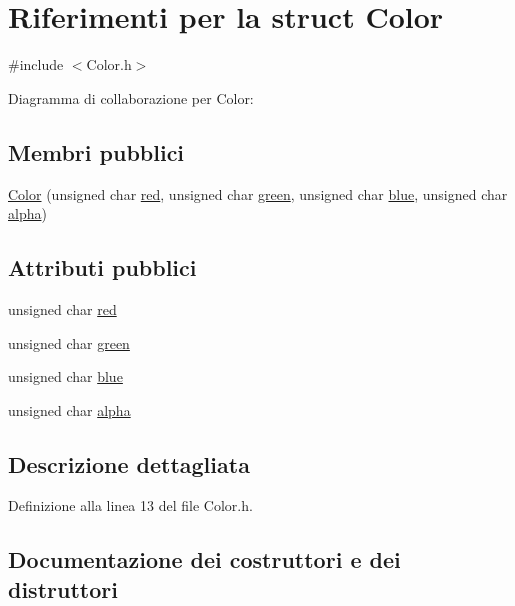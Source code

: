 \hypertarget{struct_color}{}\section{Riferimenti per la struct Color}
\label{struct_color}


{\ttfamily \#include $<$Color.\+h$>$}



Diagramma di collaborazione per Color\+:
\subsection*{Membri pubblici}
\begin{DoxyCompactItemize}
\item 
\hyperlink{struct_color_ac136abb61d2a56cd922d06880f89916d}{Color} (unsigned char \hyperlink{struct_color_a245f5a423cdaaaeff27047036c24b7ef}{red}, unsigned char \hyperlink{struct_color_a070831365fe6c626bc0020915a917081}{green}, unsigned char \hyperlink{struct_color_a5b425af958edb0e7835eb08daeb90e71}{blue}, unsigned char \hyperlink{struct_color_af485f621e60e201c55e7dae1966bb29f}{alpha})
\end{DoxyCompactItemize}
\subsection*{Attributi pubblici}
\begin{DoxyCompactItemize}
\item 
unsigned char \hyperlink{struct_color_a245f5a423cdaaaeff27047036c24b7ef}{red}
\item 
unsigned char \hyperlink{struct_color_a070831365fe6c626bc0020915a917081}{green}
\item 
unsigned char \hyperlink{struct_color_a5b425af958edb0e7835eb08daeb90e71}{blue}
\item 
unsigned char \hyperlink{struct_color_af485f621e60e201c55e7dae1966bb29f}{alpha}
\end{DoxyCompactItemize}


\subsection{Descrizione dettagliata}


Definizione alla linea 13 del file Color.\+h.



\subsection{Documentazione dei costruttori e dei distruttori}
\mbox{\label{struct_color_ac136abb61d2a56cd922d06880f89916d}} 
